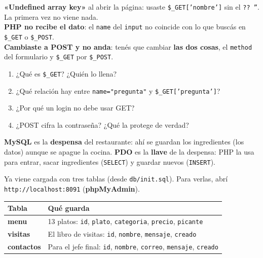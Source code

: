 \begin{errores}
\textbf{«Undefined array key»} al abrir la página: usaste \texttt{\$\_GET['nombre']} sin el \texttt{?? ''}. La primera vez no viene nada.\\[1mm]
\textbf{PHP no recibe el dato}: el \texttt{name} del \texttt{input} no coincide con lo que buscás en \texttt{\$\_GET} o \texttt{\$\_POST}.\\[1mm]
\textbf{Cambiaste a POST y no anda}: tenés que cambiar \textbf{las dos cosas}, el \texttt{method} del formulario y \texttt{\$\_GET} por \texttt{\$\_POST}.
\end{errores}

\begin{comprueba}
\begin{enumerate}
  \item ¿Qué es \texttt{\$\_GET}? ¿Quién lo llena?
  \item ¿Qué relación hay entre \texttt{name="pregunta"} y \texttt{\$\_GET['pregunta']}?
  \item ¿Por qué un login no debe usar GET?
  \item ¿POST cifra la contraseña? ¿Qué la protege de verdad?
\end{enumerate}
\end{comprueba}


\begin{analogia}
\textbf{MySQL} es la \textbf{despensa} del restaurante: ahí se guardan los ingredientes (los datos) aunque se apague la cocina.
\textbf{PDO} es la \textbf{llave} de la despensa: PHP la usa para entrar, sacar ingredientes (\texttt{SELECT}) y guardar nuevos (\texttt{INSERT}).
\end{analogia}

Ya viene cargada con tres tablas (desde \texttt{db/init.sql}). Para verlas, abrí \texttt{http://localhost:8091} (\textbf{phpMyAdmin}).

\noindent\renewcommand{\arraystretch}{1.25}
\begin{tabularx}{\linewidth}{>{\ttfamily\bfseries}l X}
\toprule
\normalfont\bfseries Tabla & \textbf{Qué guarda} \\
\midrule
menu & 13 platos: \texttt{id}, \texttt{plato}, \texttt{categoria}, \texttt{precio}, \texttt{picante} \\
visitas & El libro de visitas: \texttt{id}, \texttt{nombre}, \texttt{mensaje}, \texttt{creado} \\
contactos & Para el jefe final: \texttt{id}, \texttt{nombre}, \texttt{correo}, \texttt{mensaje}, \texttt{creado} \\
\bottomrule
\end{tabularx}


